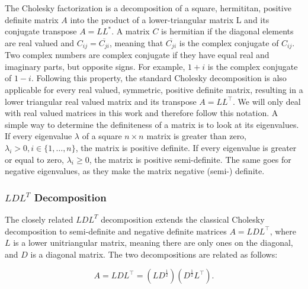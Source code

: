 The Cholesky factorization is a decomposition of a square, hermititan,
positive definite matrix $A$ into the product of a lower-triangular
matrix L and its conjugate transpose $A = L L^*$. A matrix $C$ is
hermitian if the diagonal elements are real valued and $C_{ij} =
\overline{C_{ji}}$, meaning that $\overline{C_{ji}}$ is the complex
conjugate of $C_{ij}$. Two complex numbers are complex conjugate if they
have equal real and imaginary parts, but opposite signs. For example,
$1+i$ is the complex conjugate of $1-i$. Following this property, the
standard Cholesky decomposition is also applicable for every real
valued, symmetric, positive definite matrix, resulting in a lower
triangular real valued matrix and its transpose $A = L L^\top$. We
will only deal with real valued matrices in this work and therefore
follow this notation. A simple way to determine the definiteness of a
matrix is to look at its eigenvalues. If every eigenvalue $\lambda$ of a
square $n \times n$ matrix is greater than zero, $\lambda_{i} > 0, i \in
\{1,\dots,n\}$, the matrix is positive definite. If every eigenvalue is
greater or equal to zero, $\lambda_{i} \ge 0$, the matrix is positive
semi-definite. The same goes for negative eigenvalues, as they make the
matrix negative (semi-) definite.

\subsubsection{$LDL^T$ Decomposition}

The closely related $LDL^T$ decomposition extends the classical Cholesky
decomposition to semi-definite and negative definite matrices $A = L D
L^\top$, where $L$ is a lower unitriangular matrix, meaning there are
only ones on the diagonal, and $D$ is a diagonal matrix. The two
decompositions are related as follows:

\begin{equation}
  A = LDL^\top = (L D^\frac{1}{2}) (D^\frac{1}{2}  L^\top).
\end{equation}

